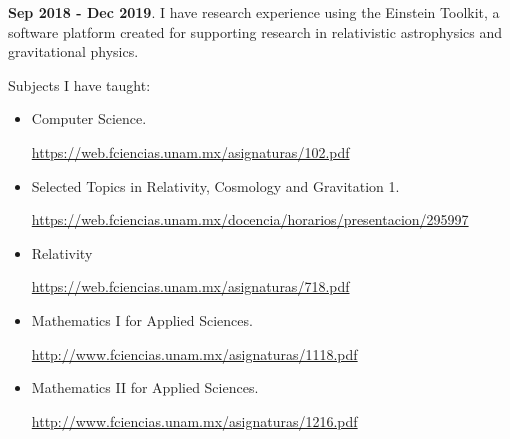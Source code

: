 \documentclass[a4paper,10pt]{article} %
\begin{document}
\textbf{Sep 2018 - Dec 2019}. I have research experience using the Einstein Toolkit, a software platform created for supporting research in relativistic astrophysics and gravitational physics.

Subjects I have taught:
\begin{itemize}
	\item Computer Science.
	
	\href{https://web.fciencias.unam.mx/asignaturas/102.pdf}{https://web.fciencias.unam.mx/asignaturas/102.pdf}
	
	\item Selected Topics in Relativity, Cosmology and Gravitation 1.
	
	\href{https://web.fciencias.unam.mx/docencia/horarios/presentacion/295997}{https://web.fciencias.unam.mx/docencia/horarios/presentacion/295997}
	
	\item Relativity
	
	\href{https://web.fciencias.unam.mx/asignaturas/718.pdf}{https://web.fciencias.unam.mx/asignaturas/718.pdf}
	
	\item Mathematics I for Applied Sciences. 
	
	\href{http://www.fciencias.unam.mx/asignaturas/1118.pdf}{http://www.fciencias.unam.mx/asignaturas/1118.pdf}
	
	\item Mathematics II for Applied Sciences.
	
	\href{http://www.fciencias.unam.mx/asignaturas/1216.pdf}{http://www.fciencias.unam.mx/asignaturas/1216.pdf}
\end{itemize}
\vspace{0.4cm}
\end{document}
